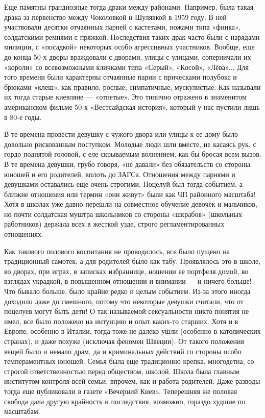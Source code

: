 Еще памятны грандиозные тогда драки между районами. Например, была такая драка
за первенство между Чоколовкой и Шулявкой в 1959 году. В ней участвовали
десятки отчаянных парней с кастетами, ножами типа «финка», солдатскими ремнями
с пряжкой. Последствия таких драк часто были с нарядами милиции, с «посадкой»
некоторых особо агрессивных участников. Вообще, еще до конца 50-х дворы
враждовали с дворами, улицы с улицами, соперничали их «короли» со всевозможными
кличками типа «Серый», «Косой», «Лёва»... Для того времени были характерны
отчаянные парни с прическами полубокс и брюками «клеш», как правило, рослые,
симпатичные, мускулистые. Как называли их тогда старые киевляне --- «отпетые».
Это типично отражено в знаменитом американском фильме 50-х «Вестсайдская
история», который у нас пустили лишь в 80-е годы. 

В те времена провести девушку с чужого двора или улицы к ее дому было довольно
рискованным поступком. Молодые люди шли вместе, не касаясь рук, с гордо
поднятой головой, с еле скрываемым волнением, как бы бросая всем вызов. В те
времена девушки, грубо говоря, «не давали» без обязательств со стороны юношей и
его родителей, вплоть до ЗАГСа. Отношения между парнями и девушками оставались
еще очень строгими. Поцелуй был тогда событием, а близкие отношения или термин
«они живут» были как ЧП районного масштаба! Хотя в школах уже давно перешли на
совместное обучение девочек и мальчиков, но почти солдатская муштра школьников
со стороны «шкрабов» (школьных работников) держала всех в жесткой узде, строго
регламентированных отношениях. 

Как такового полового воспитания не проводилось, все было пущено на
традиционный самотек, а для родителей было как табу. Проявлялось это в школе,
во дворах, при играх, в записках избраннице, ношении ее портфеля домой, во
взглядах украдкой, в повышенном отношении и внимании --- и ничего больше! Что
бывало больше, было крайне редко и целым событием. Из-за этого иногда доходило
даже до смешного, потому что некоторые девушки считали, что от поцелуев могут
быть дети! О так называемой сексуальности никто понятия не имел, все было
положено на интуицию и опыт каких-то старших. Хотя и в Европе, особенно в
Италии, тогда тоже не далеко ушли (особенно в католических странах), и даже
похуже (исключая феномен Швеции). От такого положения вещей было и немало драм,
да и криминальных действий со стороны особо темпераментных юношей. Семья была
еще традиционно крепка, многодетна, со строгой ответственностью перед
обществом, школой. Школа была главным институтом контроля всей семьи, впрочем,
как и работа родителей. Даже разводы тогда еще публиковали в газете «Вечерний
Киев». Теперешняя же половая свобода дала другую крайность и последствия,
возможно, гораздо худшие по масштабам. 


